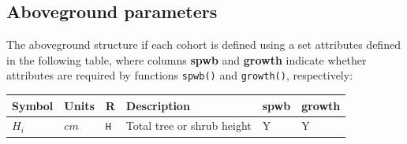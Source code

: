 \documentclass[]{book}
\begin{document}
\hypertarget{aboveground-parameters}{%
\subsection{Aboveground parameters}\label{aboveground-parameters}}

The aboveground structure if each cohort is defined using a set attributes defined in the following table, where columns \textbf{spwb} and \textbf{growth} indicate whether attributes are required by functions \texttt{spwb()} and \texttt{growth()}, respectively:

\begin{longtable}[]{@{}llllll@{}}
\toprule
\begin{minipage}[b]{0.10\columnwidth}\raggedright
Symbol\strut
\end{minipage} & \begin{minipage}[b]{0.09\columnwidth}\raggedright
Units\strut
\end{minipage} & \begin{minipage}[b]{0.06\columnwidth}\raggedright
R\strut
\end{minipage} & \begin{minipage}[b]{0.43\columnwidth}\raggedright
Description\strut
\end{minipage} & \begin{minipage}[b]{0.07\columnwidth}\raggedright
spwb\strut
\end{minipage} & \begin{minipage}[b]{0.07\columnwidth}\raggedright
growth\strut
\end{minipage}\tabularnewline
\midrule
\endhead
\begin{minipage}[t]{0.10\columnwidth}\raggedright
\(H_i\)\strut
\end{minipage} & \begin{minipage}[t]{0.09\columnwidth}\raggedright
\(cm\)\strut
\end{minipage} & \begin{minipage}[t]{0.06\columnwidth}\raggedright
\texttt{H}\strut
\end{minipage} & \begin{minipage}[t]{0.43\columnwidth}\raggedright
Total tree or shrub height\strut
\end{minipage} & \begin{minipage}[t]{0.07\columnwidth}\raggedright
Y\strut
\end{minipage} & \begin{minipage}[t]{0.07\columnwidth}\raggedright
Y\strut
\end{minipage}\tabularnewline

\end{longtable}
\end{document}
